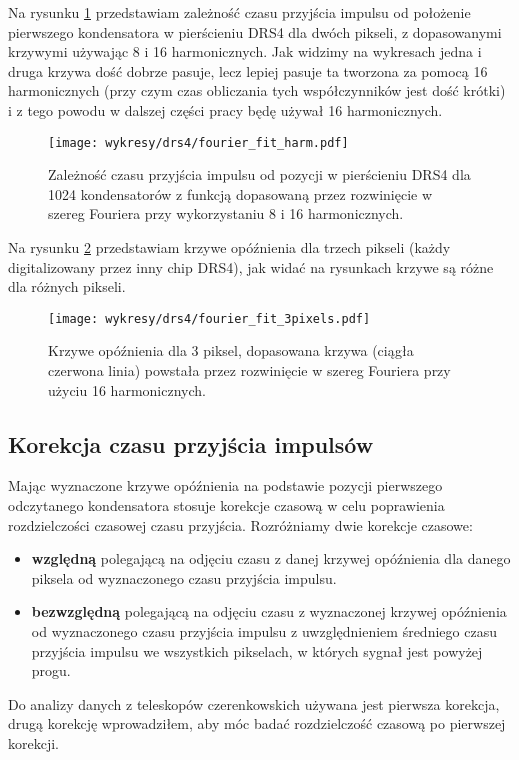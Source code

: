 \documentclass[a4paper,11pt,twoside]{article}
\begin{document}
Na rysunku \ref{fig:fourier_fit_harm} przedstawiam zależność czasu przyjścia impulsu od położenie pierwszego kondensatora w pierścieniu DRS4 dla dwóch pikseli, z dopasowanymi krzywymi używając 8 i 16 harmonicznych. Jak widzimy na wykresach jedna i druga krzywa dość dobrze pasuje, lecz lepiej pasuje ta tworzona za pomocą 16 harmonicznych (przy czym czas obliczania tych współczynników jest dość krótki) i z tego powodu w dalszej części pracy będę używał 16 harmonicznych.
\begin{figure}[H] 
\centering
\texttt{[image: wykresy/drs4/fourier\_fit\_harm.pdf]}
\caption{Zależność czasu przyjścia impulsu od pozycji w pierścieniu DRS4 dla 1024 kondensatorów z funkcją dopasowaną przez rozwinięcie w szereg Fouriera przy wykorzystaniu 8 i 16 harmonicznych.}
\label{fig:fourier_fit_harm}
\end{figure}
Na rysunku \ref{fig:fourier_fit_3} przedstawiam krzywe opóźnienia dla trzech pikseli (każdy digitalizowany przez inny chip DRS4), jak widać na rysunkach krzywe są różne dla różnych pikseli. 
\begin{figure}[H] 
\centering
\texttt{[image: wykresy/drs4/fourier\_fit\_3pixels.pdf]}
\caption{Krzywe opóźnienia dla 3 piksel, dopasowana krzywa (ciągła czerwona linia) powstała przez rozwinięcie w szereg Fouriera przy użyciu 16 harmonicznych.}
\label{fig:fourier_fit_3}
\end{figure}
\subsection{Korekcja czasu przyjścia impulsów}
Mając wyznaczone krzywe opóźnienia na podstawie pozycji pierwszego odczytanego kondensatora stosuje korekcje czasową w celu poprawienia rozdzielczości czasowej czasu przyjścia. Rozróżniamy dwie korekcje czasowe:
\begin{itemize}
\item {\bf{względną}} polegającą na odjęciu czasu z danej krzywej opóźnienia dla danego piksela od wyznaczonego czasu przyjścia impulsu.
\item {\bf{bezwzględną}} polegającą na odjęciu czasu z wyznaczonej krzywej opóźnienia od wyznaczonego czasu przyjścia impulsu z uwzględnieniem średniego czasu przyjścia impulsu we wszystkich pikselach, w których sygnał jest powyżej progu.
\end{itemize} 
Do analizy danych z teleskopów czerenkowskich używana jest pierwsza korekcja, drugą korekcję wprowadziłem, aby móc badać rozdzielczość czasową po pierwszej korekcji.
\end{document}
